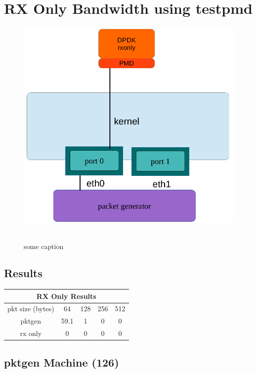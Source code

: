 \documentclass[letter]{article}
\begin{document}
\section{RX Only Bandwidth using testpmd}
{\setlength{\parindent}{0cm}

\begin{figure}[H]
\caption{some caption}
\hbox{\includegraphics[scale=0.6]{rx-only} }
\end{figure}

\subsection{Results}
\begin{center}
\begin{tabular}{ |c|c|c|c|c| }
\hline
\multicolumn{5}{|c|}{RX Only Results} \\
 \hline
 pkt size (bytes) & 64 & 128 & 256 & 512 \\ 
 pktgen & 59.1 & 1 & 0 & 0  \\ 
 rx only & 0 & 0 & 0 & 0 \\ 
 \hline
\end{tabular}
\end{center}

\subsection{pktgen Machine (126)}

}
\end{document}
